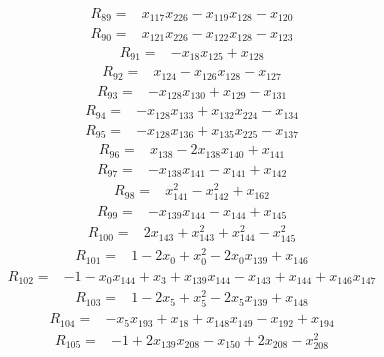 \begin{align*}
 R_{89}={}&x_{117}x_{226} -x_{119}x_{128} -x_{120}
\end{align*}
\begin{align*}
 R_{90}={}&x_{121}x_{226} -x_{122}x_{128} -x_{123}
\end{align*}
\begin{align*}
 R_{91}={}&-x_{18}x_{125} +x_{128}
\end{align*}
\begin{align*}
 R_{92}={}&x_{124} -x_{126}x_{128} -x_{127}
\end{align*}
\begin{align*}
 R_{93}={}&-x_{128}x_{130} +x_{129} -x_{131}
\end{align*}
\begin{align*}
 R_{94}={}&-x_{128}x_{133} +x_{132}x_{224} -x_{134}
\end{align*}
\begin{align*}
 R_{95}={}&-x_{128}x_{136} +x_{135}x_{225} -x_{137}
\end{align*}
\begin{align*}
 R_{96}={}&x_{138} -2x_{138}x_{140} +x_{141}
\end{align*}
\begin{align*}
 R_{97}={}&-x_{138}x_{141} -x_{141} +x_{142}
\end{align*}
\begin{align*}
 R_{98}={}&x_{141}^{2} -x_{142}^{2} +x_{162}
\end{align*}
\begin{align*}
 R_{99}={}&-x_{139}x_{144} -x_{144} +x_{145}
\end{align*}
\begin{align*}
 R_{100}={}&2x_{143} +x_{143}^{2} +x_{144}^{2} -x_{145}^{2}
\end{align*}
\begin{align*}
 R_{101}={}&1 -2x_{0} +x_{0}^{2} -2x_{0}x_{139} +x_{146}
\end{align*}
\begin{align*}
 R_{102}={}&-1 -x_{0}x_{144} +x_{3} +x_{139}x_{144} -x_{143} +x_{144} +x_{146}x_{147}
\end{align*}
\begin{align*}
 R_{103}={}&1 -2x_{5} +x_{5}^{2} -2x_{5}x_{139} +x_{148}
\end{align*}
\begin{align*}
 R_{104}={}&-x_{5}x_{193} +x_{18} +x_{148}x_{149} -x_{192} +x_{194}
\end{align*}
\begin{align*}
 R_{105}={}&-1 +2x_{139}x_{208} -x_{150} +2x_{208} -x_{208}^{2}
\end{align*}

